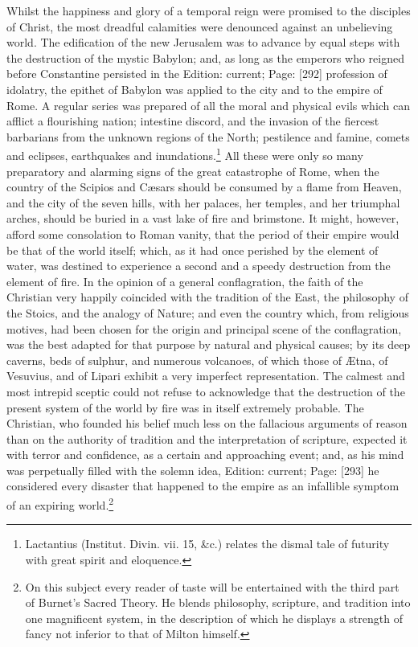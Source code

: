 Whilst the happiness and glory of a temporal reign were promised to the disciples of Christ, the most dreadful calamities were denounced against an unbelieving world. The edification of the new Jerusalem was to advance by equal steps with the destruction of the mystic Babylon; and, as long as the emperors who reigned before Constantine persisted in the Edition: current; Page: [292] profession of idolatry, the epithet of Babylon was applied to the city and to the empire of Rome. A regular series was prepared of all the moral and physical evils which can afflict a flourishing nation; intestine discord, and the invasion of the fiercest barbarians from the unknown regions of the North; pestilence and famine, comets and eclipses, earthquakes and inundations.\footnote{Lactantius (Institut. Divin. vii. 15, \&c.) relates the dismal tale of futurity with great spirit and eloquence.} All these were only so many preparatory and alarming signs of the great catastrophe of Rome, when the country of the Scipios and Cæsars should be consumed by a flame from Heaven, and the city of the seven hills, with her palaces, her temples, and her triumphal arches, should be buried in a vast lake of fire and brimstone. It might, however, afford some consolation to Roman vanity, that the period of their empire would be that of the world itself; which, as it had once perished by the element of water, was destined to experience a second and a speedy destruction from the element of fire. In the opinion of a general conflagration, the faith of the Christian very happily coincided with the tradition of the East, the philosophy of the Stoics, and the analogy of Nature; and even the country which, from religious motives, had been chosen for the origin and principal scene of the conflagration, was the best adapted for that purpose by natural and physical causes; by its deep caverns, beds of sulphur, and numerous volcanoes, of which those of Ætna, of Vesuvius, and of Lipari exhibit a very imperfect representation. The calmest and most intrepid sceptic could not refuse to acknowledge that the destruction of the present system of the world by fire was in itself extremely probable. The Christian, who founded his belief much less on the fallacious arguments of reason than on the authority of tradition and the interpretation of scripture, expected it with terror and confidence, as a certain and approaching event; and, as his mind was perpetually filled with the solemn idea, Edition: current; Page: [293] he considered every disaster that happened to the empire as an infallible symptom of an expiring world.\footnote{On this subject every reader of taste will be entertained with the third part of Burnet\texthebrew{}’s Sacred Theory. He blends philosophy, scripture, and tradition into one magnificent system, in the description of which he displays a strength of fancy not inferior to that of Milton himself.}


